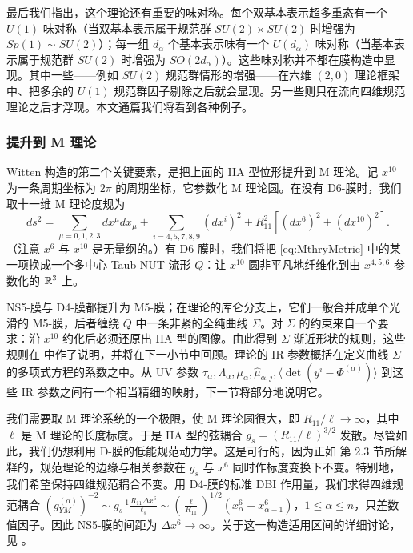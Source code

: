最后我们指出，这个理论还有重要的味对称。每个双基本表示超多重态有一个 $U(1)$ 味对称（当双基本表示属于规范群 $SU(2) \times SU(2)$ 时增强为 $Sp(1)\sim SU(2)$）；每一组 $d_\alpha$ 个基本表示味有一个 $U(d_\alpha)$ 味对称（当基本表示属于规范群 $SU(2)$ 时增强为 $SO(2 d_\alpha)$）。这些味对称并不都在膜构造中显现。其中一些——例如 $SU(2)$ 规范群情形的增强——在六维 $(2,0)$ 理论框架中、把多余的 $U(1)$ 规范群因子剔除之后就会显现。另一些则只在流向四维规范理论之后才浮现。本文通篇我们将看到各种例子。

\subsubsection{提升到 M 理论}

Witten 构造的第二个关键要素，是把上面的 IIA 型位形提升到 M 理论。记 $x^{10}$ 为一条周期坐标为 $2\pi$ 的周期坐标，它参数化 M 理论圆。在没有 D6-膜时，我们取十一维 M 理论度规为
\begin{equation}\label{eq:MthryMetric}
ds^2 = \sum_{\mu=0,1,2,3} dx^\mu dx_\mu + \sum_{i=4,5,7,8,9}
(dx^i)^2 + R_{11}^2[(dx^6)^2 + (dx^{10})^2].
\end{equation}
（注意 $x^6$ 与 $x^{10}$ 是无量纲的。）有 D6-膜时，我们将把 \eqref{eq:MthryMetric} 中的某一项换成一个多中心 Taub-NUT 流形 $Q$：让 $x^{10}$ 圆非平凡地纤维化到由 $x^{4,5,6}$ 参数化的 $\mathbb{R}^3$ 上。

NS5-膜与 D4-膜都提升为 M5-膜；在理论的库仑分支上，它们一般合并成单个光滑的 M5-膜，后者缠绕 $Q$ 中一条非紧的全纯曲线 $\Sigma$。对 $\Sigma$ 的约束来自一个要求：沿 $x^{10}$ 约化后必须还原出 IIA 型的图像。由此得到 $\Sigma$ 渐近形状的规则，这些规则在 \cite{Witten:1997sc} 中作了说明，并将在下一小节中回顾。理论的 IR 参数概括在定义曲线 $\Sigma$ 的多项式方程的系数之中。从 UV 参数 $\tau_\alpha,\Lambda_\alpha, \mu_\alpha, \hat \mu_{\alpha,j}, \langle \det(y^i - \Phi^{(\alpha)} ) \rangle$ 到这些 IR 参数之间有一个相当精细的映射，下一节将部分地说明它。

我们需要取 M 理论系统的一个极限，使 M 理论圆很大，即 $R_{11}/\ell \to \infty$，其中 $\ell$ 是 M 理论的长度标度。于是 IIA 型的弦耦合 $g_s = (R_{11}/\ell)^{3/2}$ 发散。尽管如此，我们仍想利用 D-膜的低能规范动力学。这是可行的，因为正如 \cite{Witten:1997sc} 第 2.3 节所解释的，规范理论的边缘与相关参数在 $g_s$ 与 $x^6$ 同时作标度变换下不变。特别地，我们希望保持四维规范耦合不变。用 D4-膜的标准 DBI 作用量，我们求得四维规范耦合 $(g_{YM}^{(\alpha)})^{-2} \sim g_s^{-1} \frac{R_{11}\Delta x^6}{\ell_s} \sim \left(\frac{\ell}{R_{11}}\right)^{1/2}(x^6_{\alpha} - x^6_{\alpha-1})$，$1\leq \alpha \leq n$，只差数值因子。因此 NS5-膜的间距为 $\Delta x^6 \to \infty$。关于这一构造适用区间的详细讨论，见 \cite{Witten:1997sc}。

